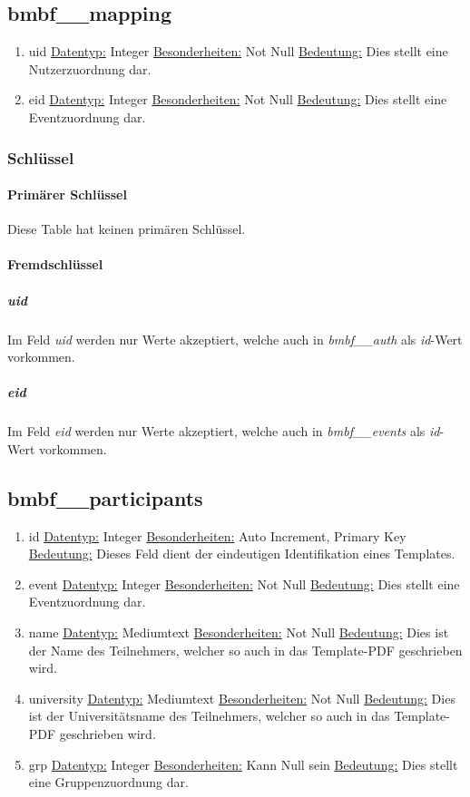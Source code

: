 \documentclass[12pt,parskip=full, pagea4]{scrreprt}
\begin{document}
			\subsection{bmbf\_\_mapping}
			\begin{enumerate}
				\item uid
				\subitem \underline{Datentyp:} Integer
				\subitem \underline{Besonderheiten:} Not Null
				\subitem \underline{Bedeutung:} Dies stellt eine Nutzerzuordnung dar.
				\item eid
				\subitem \underline{Datentyp:} Integer
				\subitem \underline{Besonderheiten:} Not Null
				\subitem \underline{Bedeutung:} Dies stellt eine Eventzuordnung dar.
			\end{enumerate}
			\leftskip=0cm
			\subsubsection{Schl\"ussel}
			\paragraph{Prim\"arer Schl\"ussel}Diese Table hat keinen prim\"aren Schl\"ussel.
			\paragraph{Fremdschl\"ussel}
				\subparagraph{uid} \leftskip=1.5cm Im Feld \textit{uid} werden nur Werte akzeptiert, welche auch in \textit{bmbf\_\_auth} als \textit{id}-Wert vorkommen.
				\subparagraph{eid} \leftskip=1.5cm Im Feld \textit{eid} werden nur Werte akzeptiert, welche auch in \textit{bmbf\_\_events} als \textit{id}-Wert vorkommen.
			\subsection{bmbf\_\_participants}
			\begin{enumerate}
				\item id
				\subitem \underline{Datentyp:} Integer
				\subitem \underline{Besonderheiten:} Auto Increment, Primary Key
				\subitem \underline{Bedeutung:} Dieses Feld dient der eindeutigen Identifikation eines Templates.
				\item event
				\subitem \underline{Datentyp:} Integer
				\subitem \underline{Besonderheiten:} Not Null
				\subitem \underline{Bedeutung:} Dies stellt eine Eventzuordnung dar.
				\item name
				\subitem \underline{Datentyp:} Mediumtext
				\subitem \underline{Besonderheiten:} Not Null
				\subitem \underline{Bedeutung:} Dies ist der Name des Teilnehmers, welcher so auch in das Template-PDF geschrieben wird.
				\item university
				\subitem \underline{Datentyp:} Mediumtext
				\subitem \underline{Besonderheiten:} Not Null
				\subitem \underline{Bedeutung:} Dies ist der Universitätsname des Teilnehmers, welcher so auch in das Template-PDF geschrieben wird.
				\item grp
				\subitem \underline{Datentyp:} Integer
				\subitem \underline{Besonderheiten:} Kann Null sein
				\subitem \underline{Bedeutung:} Dies stellt eine Gruppenzuordnung dar.
			\end{enumerate}
			\leftskip=0cm
\end{document}
